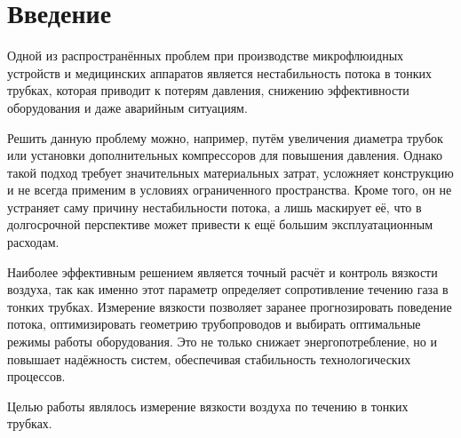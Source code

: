 \chapter{Введение}
\label{ch:intro}

Одной из распространённых проблем при производстве микрофлюидных устройств и медицинских аппаратов является нестабильность потока в тонких трубках, которая приводит к потерям давления, снижению эффективности оборудования и даже аварийным ситуациям. 

Решить данную проблему можно, например, путём увеличения диаметра трубок или установки дополнительных компрессоров для повышения давления. Однако такой подход требует значительных материальных затрат, усложняет конструкцию и не всегда применим в условиях ограниченного пространства. Кроме того, он не устраняет саму причину нестабильности потока, а лишь маскирует её, что в долгосрочной перспективе может привести к ещё большим эксплуатационным расходам.

Наиболее эффективным решением является точный расчёт и контроль вязкости воздуха, так как именно этот параметр определяет сопротивление течению газа в тонких трубках. Измерение вязкости позволяет заранее прогнозировать поведение потока, оптимизировать геометрию трубопроводов и выбирать оптимальные режимы работы оборудования. Это не только снижает энергопотребление, но и повышает надёжность систем, обеспечивая стабильность технологических процессов. 

Целью работы являлось измерение вязкости воздуха по течению в тонких трубках.